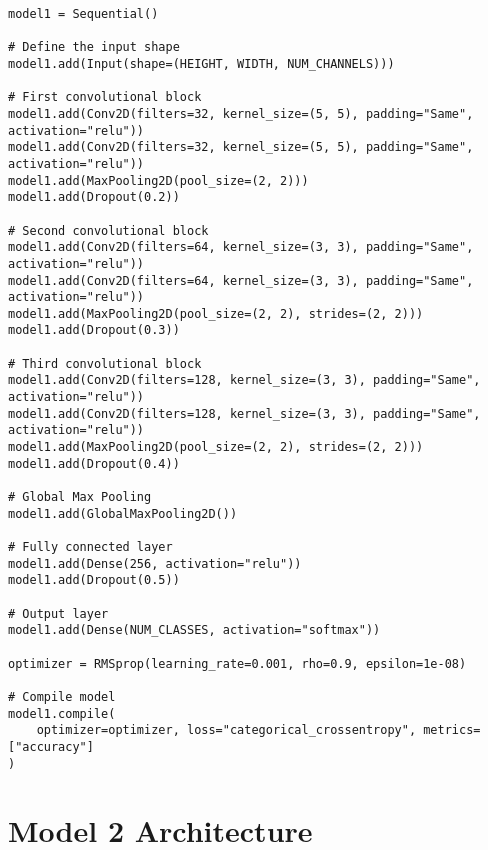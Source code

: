 \begin{verbatim}
model1 = Sequential()

# Define the input shape
model1.add(Input(shape=(HEIGHT, WIDTH, NUM_CHANNELS)))

# First convolutional block
model1.add(Conv2D(filters=32, kernel_size=(5, 5), padding="Same", activation="relu"))
model1.add(Conv2D(filters=32, kernel_size=(5, 5), padding="Same", activation="relu"))
model1.add(MaxPooling2D(pool_size=(2, 2)))
model1.add(Dropout(0.2))

# Second convolutional block
model1.add(Conv2D(filters=64, kernel_size=(3, 3), padding="Same", activation="relu"))
model1.add(Conv2D(filters=64, kernel_size=(3, 3), padding="Same", activation="relu"))
model1.add(MaxPooling2D(pool_size=(2, 2), strides=(2, 2)))
model1.add(Dropout(0.3))

# Third convolutional block
model1.add(Conv2D(filters=128, kernel_size=(3, 3), padding="Same", activation="relu"))
model1.add(Conv2D(filters=128, kernel_size=(3, 3), padding="Same", activation="relu"))
model1.add(MaxPooling2D(pool_size=(2, 2), strides=(2, 2)))
model1.add(Dropout(0.4))

# Global Max Pooling
model1.add(GlobalMaxPooling2D())

# Fully connected layer
model1.add(Dense(256, activation="relu"))
model1.add(Dropout(0.5))

# Output layer
model1.add(Dense(NUM_CLASSES, activation="softmax"))

optimizer = RMSprop(learning_rate=0.001, rho=0.9, epsilon=1e-08)

# Compile model
model1.compile(
    optimizer=optimizer, loss="categorical_crossentropy", metrics=["accuracy"]
)

\end{verbatim}

\section{Model 2 Architecture}
\label{app:app-A section3}

